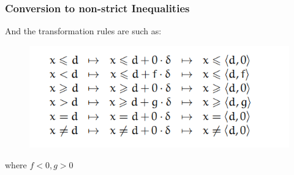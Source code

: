 \documentclass[aspectratio=169%
,serif,mathserif]{beamer}
\begin{document}
\begin{frame}
	\frametitle{Conversion to non-strict Inequalities}
	And the transformation rules are such as:
	\begin{figure}[htbp]
		\includegraphics[width=.7\linewidth]{9.png}
	\end{figure}
	where $f<0,g>0$
\end{frame}




\end{document}
